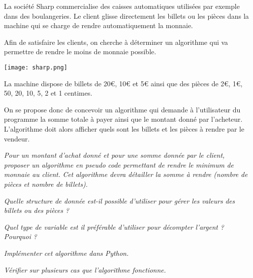 \begin{minipage}[c]{.6\linewidth}
La société Sharp commercialise des caisses automatiques utilisées par exemple dans des boulangeries. Le client glisse directement les billets ou les pièces dans la machine qui se charge de rendre automatiquement la monnaie. 
\begin{obj}
Afin de satisfaire les clients, on cherche à déterminer un algorithme qui va permettre de rendre le moins de monnaie possible. 
\end{obj}
\end{minipage}\hfill
\begin{minipage}[c]{.37\linewidth}
\begin{center}
\texttt{[image: sharp.png]}
\end{center}
\end{minipage}


La machine dispose de billets de 20€, 10€ et 5€ ainsi que des pièces de 2€, 1€, 50, 20, 10, 5, 2 et 1 centimes. 

On se propose donc de concevoir un algorithme qui demande à l'utilisateur du programme la somme totale à payer ainsi que le montant donné par l'acheteur. L'algorithme doit alors afficher quels sont les billets et les pièces à rendre par le vendeur. 


\question{}
\textit{Pour un montant d'achat donné et pour une somme donnée par le client, proposer un algorithme en pseudo code permettant de rendre le minimum de monnaie au client. Cet algorithme devra détailler la somme à rendre (nombre de pièces et nombre de billets).}

\question{}
\textit{Quelle structure de donnée est-il possible d'utiliser pour gérer les valeurs des billets ou des pièces ?}

\question{}
\textit{Quel type de variable est il préférable d'utiliser pour décompter l'argent ? Pourquoi ?}

\question{}
\textit{Implémenter cet algorithme dans Python.}

\question{}
\textit{Vérifier sur plusieurs cas que l'algorithme fonctionne.}